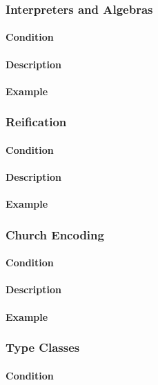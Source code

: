 \subsubsection{Interpreters and Algebras}
\paragraph{Condition}
\paragraph{Description}
\paragraph{Example}

\subsubsection{Reification}
\paragraph{Condition}
\paragraph{Description}
\paragraph{Example}

\subsubsection{Church Encoding}
\paragraph{Condition}
\paragraph{Description}
\paragraph{Example}

\subsubsection{Type Classes}
\paragraph{Condition}

